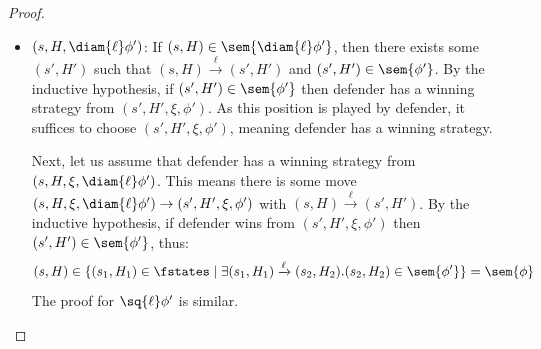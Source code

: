 \begin{proof}
\begin{itemize}
		The proof for $\bigwedge_x \phi'$ and $\fresh{x} \phi'$ is similar.
		\item $(s, H,\diam{\ell} \phi')$: If $(s, H)\in \sem{\diam{\ell} \phi'}$, then there exists some $(s', H')$ such that $(s, H) \xrightarrow{\ell} (s', H')$ and $(s', H')\in \sem{\phi'}$. 
		By the inductive hypothesis, if $(s', H')\in \sem{\phi'}$ then defender has a winning strategy from $(s', H', \xi, \phi')$.
		As this position is played by defender, it suffices to choose $(s', H', \xi, \phi')$, meaning defender has a winning strategy.  
		
		Next, let us assume that defender has a winning strategy from $(s, H, \xi, \diam{\ell} \phi')$. 
		This means there is some move $(s, H, \xi, \diam{\ell} \phi') \to (s', H', \xi, \phi')$ with $(s, H) \xrightarrow{\ell} (s', H')$. 
		By the inductive hypothesis, if defender wins from $(s', H', \xi, \phi')$ then $(s', H') \in \sem{\phi'}$, thus:
		\[
			(s, H) \in \{(s_1, H_1) \in \fstates \mid \exists (s_1, H_1) \xrightarrow{\ell} (s_2, H_2).(s_2, H_2) \in \sem{\phi'}\} = \sem{\phi}
		\]	
%		
		The proof for $\sq{\ell} \phi'$ is similar.
		

\end{itemize}
\end{proof}
